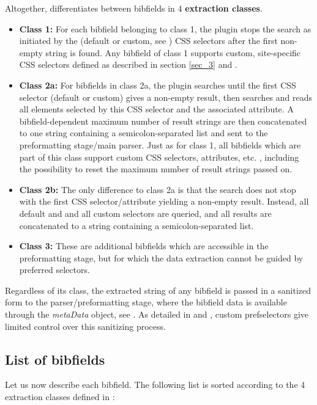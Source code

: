 \documentclass[
a4paper,
12pt,
]
{article}
\begin{document}
 Altogether, {\plgname} differentiates between bibfields in 4 \textbf{extraction classes}.
 \begin{itemize}
  \item \textbf{Class 1:} For each bibfield belonging to class 1, the plugin stops the search as initiated by the (default or custom, see ) CSS selectors after the first non-empty string is found. Any bibfield of class 1 supports custom, site-specific CSS selectors defined as described in section \ref{sec_3} and .
  
  \item \textbf{Class 2a:} For bibfields in class 2a, the plugin searches until the first CSS selector (default or custom) gives a non-empty result, then searches and reads all elements selected by this CSS selector and the associated attribute. A bibfield-dependent maximum number of result strings are then concatenated to one string containing a semicolon-separated list and sent to the preformatting stage/main parser. Just as for class 1, all bibfields which are part of this class support custom CSS selectors, attributes, etc. , including the possibility to reset the maximum number of result strings passed on.
  
  \item \textbf{Class 2b:} The only difference to class 2a is that the search does not stop with the first CSS selector/attribute yielding a non-empty result. Instead, all default and and all custom selectors are queried, and all results are concatenated to a string containing a semicolon-separated list.
  
  \item \textbf{Class 3:} These are additional bibfields which are accessible in the preformatting stage, but for which the data extraction cannot be guided by preferred selectors.
  
 \end{itemize}
 
 Regardless of its class, the extracted string of any bibfield is passed in a sanitized form to the parser/preformatting stage, where the bibfield data is available through the \textit{metaData} object, see . As detailed in  and , custom prefselectors give limited control over this sanitizing process.
 
 \subsection{List of bibfields}\label{app_bibfields_list} 
 Let us now describe each bibfield. The following list is sorted according to the 4 extraction classes defined in :
\end{document}
